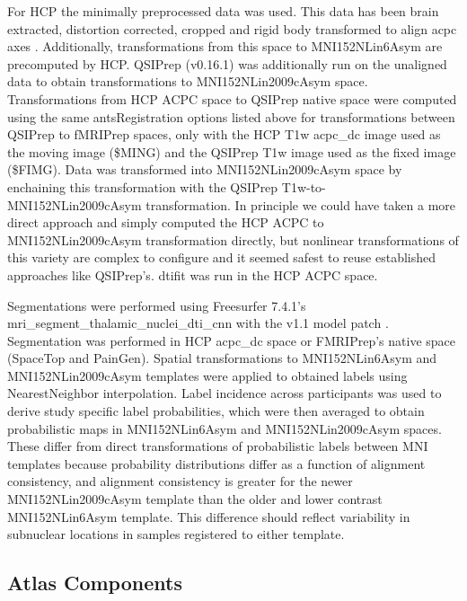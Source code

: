 \documentclass[10pt,letterpaper]{article}
\begin{document}
For HCP the minimally preprocessed data was used. This data has been brain extracted, distortion corrected, cropped and rigid body transformed to align acpc axes . Additionally, transformations from this space to MNI152NLin6Asym are precomputed by HCP. QSIPrep (v0.16.1) was additionally run on the unaligned data to obtain transformations to MNI152NLin2009cAsym space. Transformations from HCP ACPC space to QSIPrep native space were computed using the same antsRegistration options listed above for transformations between QSIPrep to fMRIPrep spaces, only with the HCP T1w acpc\_dc image used as the moving image (\$MING) and the QSIPrep T1w image used as the fixed image (\$FIMG). Data was transformed into MNI152NLin2009cAsym space by enchaining this transformation with the QSIPrep T1w-to-MNI152NLin2009cAsym transformation. In principle we could have taken a more direct approach and simply computed the HCP ACPC to MNI152NLin2009cAsym transformation directly, but nonlinear transformations of this variety are complex to configure and it seemed safest to reuse established approaches like QSIPrep's. dtifit was run in the HCP ACPC space.

Segmentations were performed using Freesurfer 7.4.1's mri\_segment\_thalamic\_nuclei\_dti\_cnn with the v1.1 model patch . Segmentation was performed in HCP acpc\_dc space or FMRIPrep's native space (SpaceTop and PainGen). Spatial transformations to MNI152NLin6Asym and MNI152NLin2009cAsym templates were applied to obtained labels using NearestNeighbor interpolation. Label incidence across participants was used to derive study specific label probabilities, which were then averaged to obtain probabilistic maps in MNI152NLin6Asym and MNI152NLin2009cAsym spaces. These differ from direct transformations of probabilistic labels between MNI templates because probability distributions differ as a function of alignment consistency, and alignment consistency is greater for the newer MNI152NLin2009cAsym template than the older and lower contrast MNI152NLin6Asym template. This difference should reflect variability in subnuclear locations in samples registered to either template.



\subsection{Atlas Components}
\end{document}
